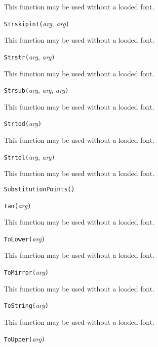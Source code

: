 This function may be used without a loaded font.


\noindent\texttt{Strskipint(}\textit{arg}, \textit{arg}\texttt{)}

This function may be used without a loaded font.


\noindent\texttt{Strstr(}\textit{arg}, \textit{arg}\texttt{)}

This function may be used without a loaded font.


\noindent\texttt{Strsub(}\textit{arg}, \textit{arg}, \textit{arg}\texttt{)}

This function may be used without a loaded font.


\noindent\texttt{Strtod(}\textit{arg}\texttt{)}

This function may be used without a loaded font.


\noindent\texttt{Strtol(}\textit{arg}, \textit{arg}\texttt{)}

This function may be used without a loaded font.


\noindent\texttt{SubstitutionPoints(}\texttt{)}


\noindent\texttt{Tan(}\textit{arg}\texttt{)}

This function may be used without a loaded font.


\noindent\texttt{ToLower(}\textit{arg}\texttt{)}

This function may be used without a loaded font.


\noindent\texttt{ToMirror(}\textit{arg}\texttt{)}

This function may be used without a loaded font.


\noindent\texttt{ToString(}\textit{arg}\texttt{)}

This function may be used without a loaded font.


\noindent\texttt{ToUpper(}\textit{arg}\texttt{)}

